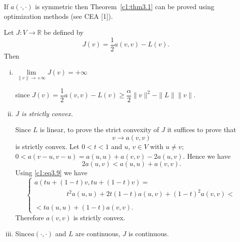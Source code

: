 \begin{remark}\label{c1:rem3.2}%
If $a(\cdot , \cdot)$ is symmetric then Theorem~\ref{c1:thm3.1} can be proved using
optimization methods (see CEA [1]). 
\end{remark}
Let $J : V \to \mathbb{R}$ be defined by 
\begin{equation}
J(v) = \frac{1}{2} a(v, v) - L(v). \tag{3.8}\label{c1:eq3.8}
\end{equation}
Then 
\begin{enumerate}[(i)]
\item $\lim \limits_{\parallel v \parallel \to +\infty} J(v) =
  +\infty$


since $J(v) = \dfrac{1}{2}a(v, v) - L(v) \geq \dfrac{\alpha}{2}
\parallel v \parallel^2 - \parallel L \parallel \parallel v
\parallel$. 

\item $J$ \textit{is strictly convex.}

Since $L$ is linear, to prove the strict convexity of $J$ it suffices
to prove that  
$$
v \to a(v, v)
$$
is strictly convex. Let $0 < t <1$ and $u$, $v \in V$ with $u
\neq v$; $0 < a(v - u, v - u) = a(u, u)+ a(v, v)-2a(u, v)$. Hence we
have  
\begin{equation}
2a (u, v) <a(u, u) +a(v, v). \tag{3.9}\label{c1:eq3.9}
\end{equation}
Using \eqref{c1:eq3.9} we have 
\begin{equation}
\begin{cases}
  a(tu + (1 - t)v, tu + (1 - t)v) =\\ 
  \hspace{2cm}t^2 a(u, u) +2t(1 - t) a (u, v) + (1
- t)^2 a(v, v) <\\ 
\\
< ta(u, u) + (1 - t) a (v, v).
\end{cases}\tag{3.10}\label{c1:eq3.10}
\end{equation}
Therefore $a(v, v)$ is strictly convex.

\item Since\pageoriginale $a(\cdot , \cdot)$ and $L$ are continuous, $J$ is continuous.
\end{enumerate}

